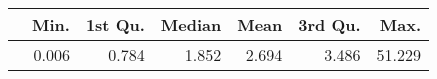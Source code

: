 \begin{table}[ht]
\centering
\begin{tabular}{rrrrrrr}
  \hline
 & Min. & 1st Qu. & Median & Mean & 3rd Qu. & Max. \\ 
  \hline
 & 0.006 & 0.784 & 1.852 & 2.694 & 3.486 & 51.229 \\ 
   \hline
\end{tabular}
\end{table}
